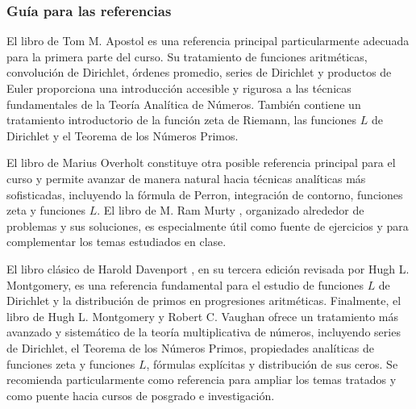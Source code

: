 \begin{refsection}
\subsubsection*{Guía para las referencias}

El libro de Tom M. Apostol \cite{Apo76} es una referencia principal particularmente adecuada para la primera parte del curso. Su tratamiento de funciones aritméticas, convolución de Dirichlet, órdenes promedio, series de Dirichlet y productos de Euler proporciona una introducción accesible y rigurosa a las técnicas fundamentales de la Teoría Analítica de Números. También contiene un tratamiento introductorio de la función zeta de Riemann, las funciones $L$ de Dirichlet y el Teorema de los Números Primos.

El libro de Marius Overholt \cite{Ove15} constituye otra posible referencia principal para el curso y permite avanzar de manera natural hacia técnicas analíticas más sofisticadas, incluyendo la fórmula de Perron, integración de contorno, funciones zeta y funciones $L$. El libro de M. Ram Murty \cite{Mur08}, organizado alrededor de problemas y sus soluciones, es especialmente útil como fuente de ejercicios y para complementar los temas estudiados en clase.

El libro clásico de Harold Davenport \cite{Dav00}, en su tercera edición revisada por Hugh L. Montgomery, es una referencia fundamental para el estudio de funciones $L$ de Dirichlet y la distribución de primos en progresiones aritméticas. Finalmente, el libro de Hugh L. Montgomery y Robert C. Vaughan \cite{MV07} ofrece un tratamiento más avanzado y sistemático de la teoría multiplicativa de números, incluyendo series de Dirichlet, el Teorema de los Números Primos, propiedades analíticas de funciones zeta y funciones $L$, fórmulas explícitas y distribución de sus ceros. Se recomienda particularmente como referencia para ampliar los temas tratados y como puente hacia cursos de posgrado e investigación.

\nocite{Apo76}
\nocite{Dav00}
\nocite{Ove15}
\nocite{Mur08}
\nocite{MV07}

\printcursosbibliography
\end{refsection}
